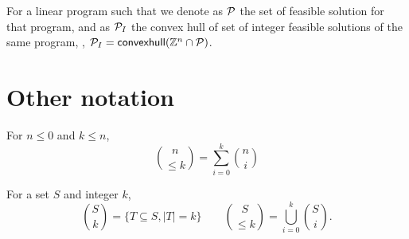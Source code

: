 \documentclass[a4paper,justified]{tufte-handout}
\begin{document}
For a linear program such that we denote as $ \mathcal{P} $ the set of
feasible solution for that program, and as $ \mathcal{P}_{I} $ the convex
hull of set of integer feasible solutions of the same program, \ie, $
\mathcal{P}_{I} = \mathsf{convexhull}(\mathbb{Z}^{n} \cap \mathcal{P}) $.

\section{Other notation}

For $ n\leq 0 $ and $ k\leq n $,
\begin{equation*}
  \binom{n}{\leq k} = \sum^{k}_{i=0}\binom{n}{i} 
\end{equation*}

For a set $ S $ and integer $k$,
\begin{equation*}
  \binom{S}{k}= \{ T \subseteq S, |T|=k  \} \qquad \binom{S}{\leq k} =
  \bigcup^{k}_{i=0} \binom{S}{i}.
\end{equation*}


% 
% 
\end{document}
